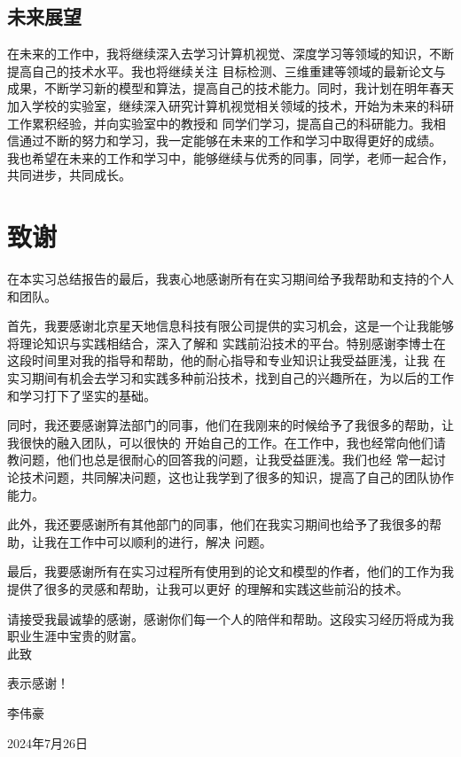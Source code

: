 \documentclass{nwputhesis}
\begin{document}
\subsection{未来展望}
在未来的工作中，我将继续深入去学习计算机视觉、深度学习等领域的知识，不断提高自己的技术水平。我也将继续关注
目标检测、三维重建等领域的最新论文与成果，不断学习新的模型和算法，提高自己的技术能力。同时，我计划在明年春天
加入学校的实验室，继续深入研究计算机视觉相关领域的技术，开始为未来的科研工作累积经验，并向实验室中的教授和
同学们学习，提高自己的科研能力。我相信通过不断的努力和学习，我一定能够在未来的工作和学习中取得更好的成绩。
我也希望在未来的工作和学习中，能够继续与优秀的同事，同学，老师一起合作，共同进步，共同成长。


\makespace
\section*{致谢}
在本实习总结报告的最后，我衷心地感谢所有在实习期间给予我帮助和支持的个人和团队。

首先，我要感谢北京星天地信息科技有限公司提供的实习机会，这是一个让我能够将理论知识与实践相结合，深入了解和
实践前沿技术的平台。特别感谢李博士在这段时间里对我的指导和帮助，他的耐心指导和专业知识让我受益匪浅，让我
在实习期间有机会去学习和实践多种前沿技术，找到自己的兴趣所在，为以后的工作和学习打下了坚实的基础。

同时，我还要感谢算法部门的同事，他们在我刚来的时候给予了我很多的帮助，让我很快的融入团队，可以很快的
开始自己的工作。在工作中，我也经常向他们请教问题，他们也总是很耐心的回答我的问题，让我受益匪浅。我们也经
常一起讨论技术问题，共同解决问题，这也让我学到了很多的知识，提高了自己的团队协作能力。

此外，我还要感谢所有其他部门的同事，他们在我实习期间也给予了我很多的帮助，让我在工作中可以顺利的进行，解决
问题。

最后，我要感谢所有在实习过程所有使用到的论文和模型的作者，他们的工作为我提供了很多的灵感和帮助，让我可以更好
的理解和实践这些前沿的技术。

请接受我最诚挚的感谢，感谢你们每一个人的陪伴和帮助。这段实习经历将成为我职业生涯中宝贵的财富。
\\

\noindent 此致

\noindent 表示感谢！

\noindent 李伟豪

\noindent 2024年7月26日

\makespace
\end{document}
